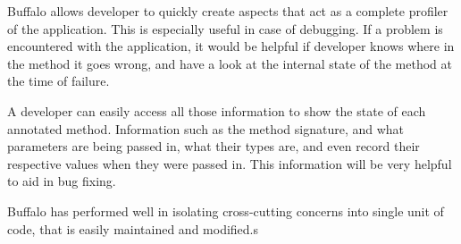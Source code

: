 Buffalo allows developer to quickly create aspects that act as a complete profiler of the application. This is especially useful in case of debugging. If a problem is encountered with the application, it would be helpful if developer knows where in the method it goes wrong, and have a look at the internal state of the method at the time of failure.

A developer can easily access all those information to show the state of each annotated method. Information such as the method signature, and what parameters are being passed in, what their types are, and even record their respective values when they were passed in. This information will be very helpful to aid in bug fixing.

Buffalo has performed well in isolating cross-cutting concerns into single unit of code, that is easily maintained and modified.s
